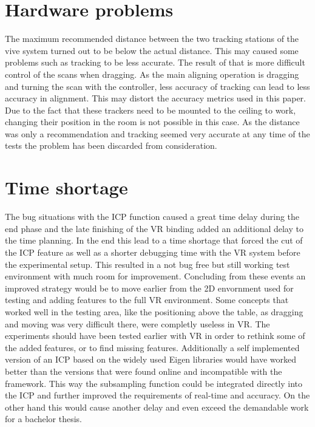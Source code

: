 \documentclass[hyperref,english,bachelorofscience,bibnum,twoside]{cgvpub}
\begin{document}
\section{Hardware problems}

The maximum recommended distance between the two tracking stations of the vive system turned out to be below the actual distance. This may caused some problems such as tracking to be less accurate. The result of that is more difficult control of the scans when dragging. As the main aligning operation is dragging and turning the scan with the controller, less accuracy of tracking can lead to less accuracy in alignment. This may distort the accuracy metrics used in this paper. Due to the fact that these trackers need to be mounted to the ceiling to work, changing their position in the room is not possible in this case. As the distance was only a recommendation and tracking seemed very accurate at any time of the tests the problem has been discarded from consideration.

\section{Time shortage}

The bug situations with the ICP function caused a great time delay during the end phase and the late finishing of the VR binding added an additional delay to the time planning. In the end this lead to a time shortage that forced the cut of the ICP feature as well as a shorter debugging time with the VR system before the experimental setup. This resulted in a not bug free but still working test environment with much room for improvement. Concluding from these events an improved strategy would be to move earlier from the 2D envornment used for testing and adding features to the full VR environment. Some concepts that worked well in the testing area, like the positioning above the table, as dragging and moving was very difficult there, were completly useless in VR. The experiments should have been tested earlier with VR in order to rethink some of the added features, or to find missing features. Additionally a self implemented version of an ICP based on the widely used Eigen libraries would have worked better than the versions that were found online and incompatible with the framework. This way the subsampling function could be integrated directly into the ICP and further improved the requirements of real-time and accuracy. On the other hand this would cause another delay and even exceed the demandable work for a bachelor thesis.
\end{document}
